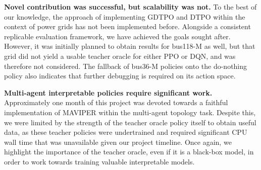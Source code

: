 \textbf{Novel contribution was successful, but scalability was not.} To the best of our knowledge, the approach of implementing GDTPO and DTPO within the context of power grids has not been implemented before. Alongside a consistent replicable evaluation framework, we have achieved the goals sought after. However, it was initially planned to obtain results for bus118-M as well, but that grid did not yield a usable teacher oracle for either PPO or DQN, and was therefore not considered. The fallback of bus36-M policies onto the do-nothing policy also indicates that further debugging is required on its action space.  

\textbf{Multi-agent interpretable policies require significant work.} Approximately one month of this project was devoted towards a faithful implementation of MAVIPER \cite{milani2022maviper} within the multi-agent topology task. Despite this, we were limited by the strength of the teacher oracle policy itself to obtain useful data, as these teacher policies were undertrained and required significant CPU wall time that was unavailable given our project timeline. Once again, we highlight the importance of the teacher oracle, even if it is a black-box model, in order to work towards training valuable interpretable models.
